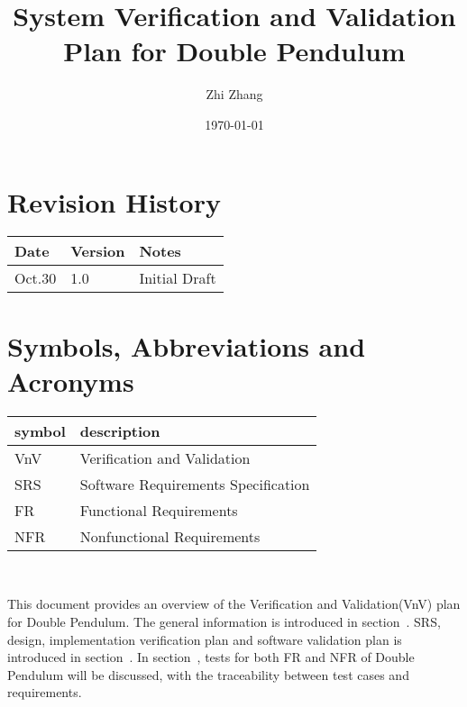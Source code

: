 \documentclass[12pt, titlepage]{article}
\begin{document}
\title{System Verification and Validation Plan for Double Pendulum} 
\author{Zhi Zhang}
\date{\today}
	
\maketitle


\section{Revision History}

\begin{tabularx}{\textwidth}{p{3cm}p{2cm}X}
\toprule {\bf Date} & {\bf Version} & {\bf Notes}\\
\midrule
Oct.30 & 1.0 & Initial Draft\\

\bottomrule
\end{tabularx}

\newpage

\tableofcontents

\listoftables

\listoffigures

\newpage

\section{Symbols, Abbreviations and Acronyms}

\renewcommand{\arraystretch}{1.2}
\begin{tabular}{l l} 
  \toprule		
  \textbf{symbol} & \textbf{description}\\
  \midrule 
  VnV & Verification and Validation\\
  SRS & Software Requirements Specification\\
  FR & Functional Requirements\\
  NFR & Nonfunctional Requirements\\
  \bottomrule
\end{tabular}\\

\newpage


This document provides an overview of the Verification and Validation(VnV) plan
for Double Pendulum. The general information is introduced in
section~. SRS, design, implementation verification plan
and software validation plan is introduced in section~. In
section~, tests for both FR and NFR of Double Pendulum will
be discussed, with the traceability between test cases and requirements.
\end{document}
